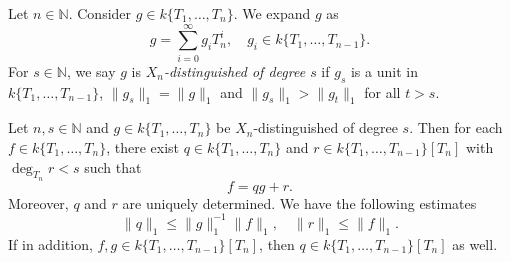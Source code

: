 \begin{definition}
   Let $n\in \mathbb{N}$. Consider $g\in k\{T_1,\ldots,T_n\}$. We expand $g$ as
   \[
        g=\sum_{i=0}^{\infty}g_i T_n^{i},\quad g_i\in k\{T_1,\ldots,T_{n-1}\}.
   \] 
   For $s\in \mathbb{N}$, we say $g$ is \emph{$X_n$-distinguished of degree $s$} if $g_s$ is a unit in $k\{T_1,\ldots,T_{n-1}\}$, $\|g_s\|_{1}=\|g\|_1$ and $\|g_s\|_1>\|g_{t}\|_1$ for all $t>s$.
\end{definition}

\begin{thm}\label{thm-Weierstrassdivision}
    Let $n,s\in \mathbb{N}$ and $g\in k\{T_1,\ldots,T_n\}$ be $X_n$-distinguished of degree $s$. Then for each $f\in k\{T_1,\ldots,T_n\}$, there exist $q\in k\{T_1,\ldots,T_n\}$ and $r\in k\{T_1,\ldots,T_{n-1}\}[T_n]$ with $\deg_{T_n}r<s$ such that 
    \[
        f=qg+r.
    \]
    Moreover, $q$ and $r$ are uniquely determined. We have the following estimates
    \begin{equation}\label{eq-estiWeirediv}
        \|q\|_1\leq \|g\|_1^{-1}\|f\|_1,\quad \|r\|_1\leq \|f\|_1.   
    \end{equation}
    If in addition, $f,g\in k\{T_1,\ldots,T_{n-1}\}[T_n]$, then $q\in k\{T_1,\ldots,T_{n-1}\}[T_n]$ as well. 
\end{thm}
